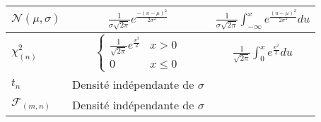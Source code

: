\begin{center}
\begin{tabular}{|l|c|c|}
	\hline
	$\mathcal{N}(\mu,\sigma)$ & $\frac{1}{\sigma\sqrt{2\pi}}e^{\frac{-(x-\mu)^2}{2\sigma^2}}$            & $\frac{1}{\sigma\sqrt{2\pi}}\int_{-\infty}^xe^{\frac{(u-\mu)^2}{2\sigma^2}}du$\\
	\hline
	$\chi^2_{(n)}$            & $\begin{cases}
			      \frac{1}{\sqrt{2\pi}}e^{\frac{x^2}{2}}&x>0\\
			      0&x\leq0
			   \end{cases}$                                                & $\frac{1}{\sqrt{2\pi}}\int_0^xe^{\frac{x^2}{2}}du$\\
	\hline
	$t_n$                     & Densité indépendante de $\sigma$                             & \\
	\hline
	$\mathcal{F}_{(m,n)}$     & Densité indépendante de $\sigma$                             & \\
	\hline
\end{tabular}
\end{center}


